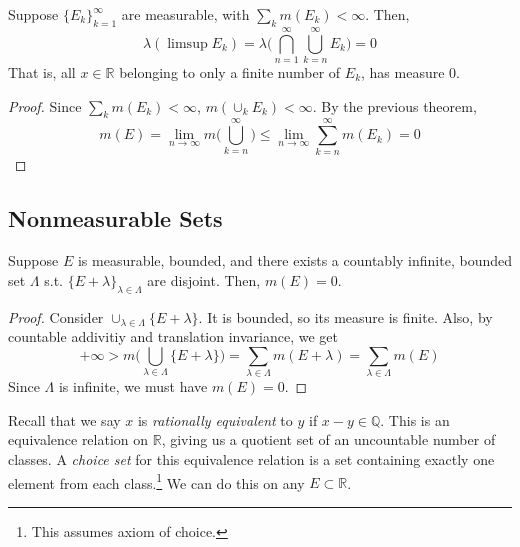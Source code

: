   \begin{lemma}
    Suppose $\{E_k\}_{k=1}^\infty$ are measurable, with $\sum_{k} m(E_k) < \infty$. Then, 
    \begin{equation}
      \lambda(\limsup E_k) = \lambda \bigg( \bigcap_{n=1}^\infty \bigcup_{k=n}^\infty E_k \bigg) = 0
    \end{equation}
    That is, all $x \in \mathbb{R}$ belonging to only a finite number of $E_k$, has measure $0$. 
  \end{lemma}
  \begin{proof}
    Since $\sum_k m(E_k) < \infty$, $m ( \cup_k E_k) < \infty$. By the previous theorem, 
    \begin{equation}
      m(E) = \lim_{n \to \infty} m \bigg( \bigcup_{k=n}^\infty \bigg) \leq \lim_{n \to \infty} \sum_{k=n}^\infty m(E_k) = 0
    \end{equation}
  \end{proof}

\subsection{Nonmeasurable Sets} 

  \begin{lemma}
    Suppose $E$ is measurable, bounded, and there exists a countably infinite, bounded set $\Lambda$ s.t. $\{E + \lambda\}_{\lambda \in \Lambda}$ are disjoint. Then, $m(E) = 0$. 
  \end{lemma}
  \begin{proof}
    Consider $\cup_{\lambda \in \Lambda} \{E + \lambda\}$. It is bounded, so its measure is finite. Also, by countable addivitiy and translation invariance, we get 
    \begin{equation}
      +\infty > m \bigg( \bigcup_{\lambda \in \Lambda} \{E + \lambda\} \bigg) = \sum_{\lambda \in \Lambda} m (E + \lambda) = \sum_{\lambda \in \Lambda} m(E)
    \end{equation}
    Since $\Lambda$ is infinite, we must have $m(E) = 0$. 
  \end{proof}

  Recall that we say $x$ is \textit{rationally equivalent} to $y$ if $x - y \in \mathbb{Q}$. This is an equivalence relation on $\mathbb{R}$, giving us a quotient set of an uncountable number of classes. A \textit{choice set} for this equivalence relation is a set containing exactly one element from each class.\footnote{This assumes axiom of choice.} We can do this on any $E \subset \mathbb{R}$. 

